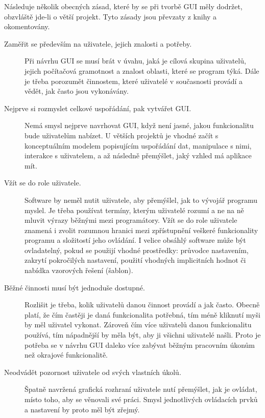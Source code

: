 \documentclass[a4paper,12pt,draft]{article}
\begin{document}
{Následuje několik obecných zásad, které by se při tvorbě GUI měly
dodržet, obzvláště jde-li o větší projekt. Tyto zásady jsou převzaty
z knihy \cite{bloopers} a okomentovány.
\begin{description}
    \item[Zaměřit se především na uživatele, jejich znalosti a
    potřeby.] Při návrhu GUI se musí brát v úvahu, jaká je cílová
    skupina uživatelů, jejich počítačová gramotnost a znalost oblasti,
    které se program týká. Dále je třeba porozumět činnostem,
    které uživatelé v současnosti provádí a vědět, jak často jsou
    vykonávány.

\item [Nejprve si rozmyslet celkové uspořádání, pak vytvářet GUI.] Nemá
smysl nejprve navrhovat GUI, když není jasné, jakou funkcionalitu
bude uživatelům nabízet. U větších projektů je vhodné začít s
konceptuálním modelem popisujícím uspořádání dat, manipulace s nimi,
interakce s uživatelem, a až následně přemýšlet, jaký vzhled má
aplikace mít.

\item [Vžít se do role uživatele.] Software by neměl nutit uživatele,
aby přemýšlel, jak to vývojář programu myslel. Je třeba používat
termíny, kterým uživatelé rozumí a ne na ně mluvit výrazy běžnými
mezi programátory. Vžít se do role uživatele znamená i zvolit rozumnou
hranici mezi zpřístupnění veškeré funkcionality programu a složitostí
jeho ovládání. I velice obsáhlý software může být ovladatelný,
pokud se použijí vhodné prostředky: průvodce nastavením, zakrytí
pokročilých nastavení, použití vhodných implicitních hodnot či
nabídka vzorových řešení (šablon).

\item [Běžné činnosti musí být jednoduše dostupné.] Rozlišit je
třeba, kolik uživatelů danou činnost provádí a jak často. Obecně
platí, že čím častěji je daná funkcionalita potřebná, tím méně
kliknutí myši by měl uživatel vykonat. Zároveň čím více uživatelů
danou funkcionalitu používá, tím nápadnější  by měla být, aby
ji všichni uživatelé našli. Proto je potřeba se v návrhu GUI  daleko
více zabývat běžným pracovním úkonům než okrajové funkcionalitě.

\item [Neodvádět pozornost uživatele od svých vlastních úkolů.] Špatně
navržená grafická rozhraní uživatele nutí přemýšlet, jak je ovládat,
místo toho, aby se věnovali své práci. Smysl jednotlivých ovládacích
prvků a nastavení by proto měl být zřejmý.


\end{description}}
\end{document}

